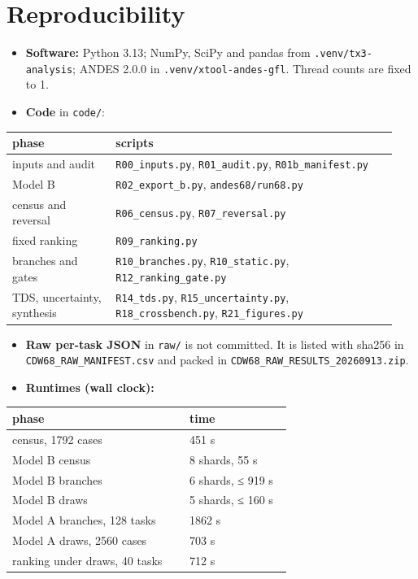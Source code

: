 \documentclass[10pt,a4paper]{article}
\begin{document}
\section{Reproducibility}
\begin{itemize}
\item \textbf{Software:} Python 3.13; NumPy, SciPy and pandas from \texttt{.venv/\allowbreak{}tx3-analysis}; ANDES 2.0.0 in \texttt{.venv/\allowbreak{}xtool-andes-gfl}. Thread counts are fixed to 1.
\item \textbf{Code} in \texttt{code/\allowbreak{}}:
\end{itemize}
{\small
\begin{longtable}{L{0.254\linewidth}L{0.686\linewidth}}
\toprule
\textbf{phase} & \textbf{scripts} \\
\midrule
\endhead
inputs and audit & \texttt{R00\_\allowbreak{}inputs.py}, \texttt{R01\_\allowbreak{}audit.py}, \texttt{R01b\_\allowbreak{}manifest.py} \\
Model B & \texttt{R02\_\allowbreak{}export\_\allowbreak{}b.py}, \texttt{andes68/\allowbreak{}run68.py} \\
census and reversal & \texttt{R06\_\allowbreak{}census.py}, \texttt{R07\_\allowbreak{}reversal.py} \\
fixed ranking & \texttt{R09\_\allowbreak{}ranking.py} \\
branches and gates & \texttt{R10\_\allowbreak{}branches.py}, \texttt{R10\_\allowbreak{}static.py}, \texttt{R12\_\allowbreak{}ranking\_\allowbreak{}gate.py} \\
TDS, uncertainty, synthesis & \texttt{R14\_\allowbreak{}tds.py}, \texttt{R15\_\allowbreak{}uncertainty.py}, \texttt{R18\_\allowbreak{}crossbench.py}, \texttt{R21\_\allowbreak{}figures.py} \\
\bottomrule
\end{longtable}}
\begin{itemize}
\item \textbf{Raw per-task JSON} in \texttt{raw/\allowbreak{}} is not committed. It is listed with sha256 in \texttt{CDW68\_\allowbreak{}RAW\_\allowbreak{}MANIFEST.csv} and packed in \texttt{CDW68\_\allowbreak{}RAW\_\allowbreak{}RESULTS\_\allowbreak{}20260913.zip}.
\item \textbf{Runtimes (wall clock):}
\end{itemize}
{\small
\begin{longtable}{L{0.593\linewidth}L{0.347\linewidth}}
\toprule
\textbf{phase} & \textbf{time} \\
\midrule
\endhead
census, 1792 cases & 451 s \\
Model B census & 8 shards, 55 s \\
Model B branches & 6 shards, ≤ 919 s \\
Model B draws & 5 shards, ≤ 160 s \\
Model A branches, 128 tasks & 1862 s \\
Model A draws, 2560 cases & 703 s \\
ranking under draws, 40 tasks & 712 s \\
\bottomrule
\end{longtable}}
\end{document}
